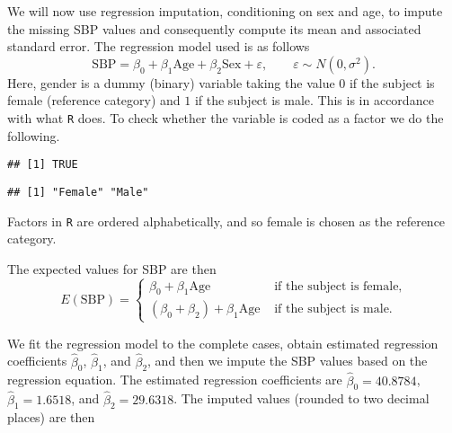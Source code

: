 \documentclass[
]{article}
\newenvironment{Shaded}{\begin{snugshade}}{\end{snugshade}}
\newcommand{\CommentTok}[1]{\textcolor[rgb]{0.56,0.35,0.01}{\textit{#1}}}
\newcommand{\KeywordTok}[1]{\textcolor[rgb]{0.13,0.29,0.53}{\textbf{#1}}}
\newcommand{\NormalTok}[1]{#1}
\newcommand{\OperatorTok}[1]{\textcolor[rgb]{0.81,0.36,0.00}{\textbf{#1}}}
\begin{document}
We will now use regression imputation, conditioning on sex and age, to
impute the missing SBP values and consequently compute its mean and
associated standard error. The regression model used is as follows
\begin{equation*}
\text{SBP}=\beta_{0}+\beta_{1}\text{Age}+\beta_{2}\text{Sex}+\varepsilon,\qquad \varepsilon\sim{N}(0,\sigma^2).
\end{equation*} Here, gender is a dummy (binary) variable taking the
value \(0\) if the subject is female (reference category) and \(1\) if
the subject is male. This is in accordance with what \texttt{R} does. To
check whether the variable is coded as a factor we do the following.

\begin{Shaded}
\end{Shaded}

\begin{verbatim}
## [1] TRUE
\end{verbatim}

\begin{Shaded}
\end{Shaded}

\begin{verbatim}
## [1] "Female" "Male"
\end{verbatim}

Factors in \texttt{R} are ordered alphabetically, and so female is
chosen as the reference category.

The expected values for SBP are then \begin{equation*}
E(\text{SBP})=\begin{cases}
\beta_0+\beta_1\text{Age} & \mbox{ if the subject is female,}\\
(\beta_0+\beta_2)+\beta_1\text{Age} & \mbox{ if the subject is male.}
\end{cases}
\end{equation*}

We fit the regression model to the complete cases, obtain estimated
regression coefficients \(\widehat{\beta}_0\), \(\widehat{\beta}_1\),
and \(\widehat{\beta}_2\), and then we impute the SBP values based on
the regression equation. The estimated regression coefficients are
\(\widehat{\beta}_0=40.8784\), \(\widehat{\beta}_1=1.6518\), and
\(\widehat{\beta}_2=29.6318\). The imputed values (rounded to two
decimal places) are then
\end{document}
